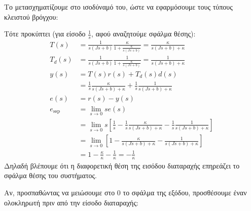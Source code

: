 \documentclass[11pt,a4paper,notitlepage,fleqn,draft]{article}
\begin{document}
Το μετασχηματίζουμε στο ισοδύναμό του, ώστε να εφαρμόσουμε τους τύπους κλειστού βρόγχου:


Τότε προκύπτει (για είσοδο \( \frac{1}{s} \), αφού αναζητούμε σφάλμα θέσης):
\begin{align*}
    T(s) &= \frac{1}{s(Js+b)}\frac{κ}{1+\frac{κ}{s(Js+b)}} 
    = \frac{κ}{s(Js+b)+κ}\\
    T_{d}(s) &= \frac{1}{s(Js+b)}\frac{1}{1+\frac{κ}{s(Js+b)}}
    = \frac{1}{s(Js+b)+κ}
     \\
    y(s) &= T(s)r(s) + T_d(s)d(s)
    \\ &= \frac{1}{s}\frac{κ}{s(Js+b)+κ} + \frac{1}{s}\frac{1}{s(Js+b)+κ}
    \\
    e(s) &= r(s) - y(s) \\
    e_{\mathrm{ssp}} &= \lim_{s\to 0} se(s)
    \\ &= \lim_{s \to 0} s\left[
    \frac{1}{s} - \frac{1}{s}\frac{κ}{s(Js+b)+κ} - \frac{1}{s}\frac{1}{s(Js+b)+κ}
    \right]
    \\
    &= \lim_{s\to 0} \left[
    1 - \frac{κ}{s(Js+b)+κ} - \frac{1}{s(Js+b)+κ}
    \right] \\
    &= 1-\frac{κ}{κ}-\frac{1}{κ} = -\frac{1}{κ}
\end{align*}
Δηλαδή βλέπουμε ότι η διαφορετική θέση της εισόδου διαταραχής επηρεάζει το σφάλμα θέσης του
συστήματος.

Αν, προσπαθώντας να μειώσουμε στο 0 το σφάλμα της εξόδου, προσθέσουμε έναν ολοκληρωτή
πριν από την είσοδο διαταραχής:
\end{document}
